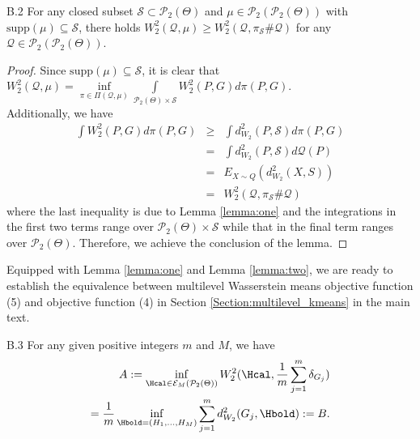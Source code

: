 \begin{customlem}{B.2} \label{lemma:two}
For any closed subset $\mathcal{S} \subset \mathcal{P}_{2}(\Theta)$ and $\mu \in \mathcal{P}_{2}(\mathcal{P}_{2}(\Theta))$ 
with $\text{supp}(\mu) \subseteq \mathcal{S}$, 
there holds 
$W_2^2 (\mathcal{Q},\mu ) \ge W_2^2 (\mathcal{Q},\pi _\mathcal{S} \# \mathcal{Q})$ for any $\mathcal{Q} \in \mathcal{P}_{2}(\mathcal{P}_{2}(\Theta))$.
\end{customlem}
\begin{proof}
Since $\text{supp}(\mu) \subseteq \mathcal{S}$, it is clear that $W_2^2 (\mathcal{Q},\mu) = {\displaystyle \mathop {\inf }\limits_{\pi  \in \Pi (\mathcal{Q},\mu )} \int\limits_{\mathcal{P}_{2}(\Theta) \times \mathcal{S}} {W_{2}^{2}(P,G)} d\pi (P,G)}$.\\
Additionally, we have
\begin{eqnarray}
\int {W_{2}^{2}(P,G)} d\pi (P,G) & \geq & \int {d_{W_{2}}^{2}(P,\mathcal{S})} d\pi (P,G) \nonumber \\
& = &  \int {d_{W_{2}}^{2}(P,\mathcal{S})} d\mathcal{Q}(P) \nonumber \\
& = & E_{X \sim Q} (d_{W_{2}}^{2}(X,S)) \nonumber \\
& = & W_2^2 (\mathcal{Q},\pi _\mathcal{S} \# \mathcal{Q}) \nonumber
\end{eqnarray}
where the last inequality is due to Lemma \ref{lemma:one} and the integrations in the first two terms range over $\mathcal{P}_{2}(\Theta) \times \mathcal{S}$ while that in the final term ranges over $\mathcal{P}_{2}(\Theta)$. Therefore, we achieve the conclusion of the lemma.
\end{proof}
Equipped with Lemma \ref{lemma:one} and Lemma \ref{lemma:two}, 
we are ready to establish 
the equivalence between multilevel Wasserstein means objective function (5) and objective function (4) in Section \ref{Section:multilevel_kmeans} in the main text.
\begin{customlem}{B.3} \label{proposition:Wassersteinequivalence}
For any given positive integers $m$ and $M$, we have
\begin{eqnarray}
A : = \inf \limits_{\Hcal \in \mathcal{E}_{M}(\mathcal{P}_{2}(\Theta))} W_{2}^{2}(\Hcal,\dfrac{1}{m}\mathop {\sum }\limits_{j=1}^{m}{\delta_{G_{j}}}) \nonumber \\
= \dfrac{1}{m}\inf \limits_{\Hbold = (H_{1},\ldots,H_{M})}\sum \limits_{j=1}^{m} d_{W_{2}}^{2}(G_{j},\Hbold) := B. \nonumber
\end{eqnarray}
\end{customlem}
